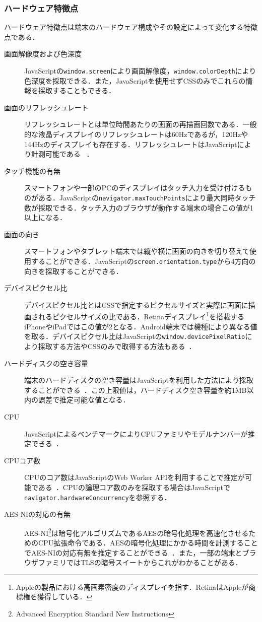 \subsubsection{ハードウェア特徴点}
ハードウェア特徴点は端末のハードウェア構成やその設定によって変化する特徴点である．
\begin{description}
\item[画面解像度および色深度]JavaScriptの\texttt{window.screen}により画面解像度，\texttt{window.colorDepth}により色深度を採取できる．また，JavaScriptを使用せずCSSのみでこれらの情報を採取することもできる．
\item[画面のリフレッシュレート]リフレッシュレートとは単位時間あたりの画面の再描画回数である．一般的な液晶ディスプレイのリフレッシュレートは60Hzであるが，120Hzや144Hzのディスプレイも存在する．リフレッシュレートはJavaScriptにより計測可能である~\cite{takasu2015survey} ．
\item[タッチ機能の有無]スマートフォンや一部のPCのディスプレイはタッチ入力を受け付けるものがある．JavaScriptの\texttt{navigator.maxTouchPoints}により最大同時タッチ数が採取できる．タッチ入力のブラウザが動作する端末の場合この値が1以上になる．
\item[画面の向き]スマートフォンやタブレット端末では縦や横に画面の向きを切り替えて使用することができる．JavaScriptの\texttt{screen.orientation.type}から4方向の向きを採取することができる．
\item[デバイスピクセル比]デバイスピクセル比とはCSSで指定するピクセルサイズと実際に画面に描画されるピクセルサイズの比である．Retinaディスプレイ\footnote{Appleの製品における高画素密度のディスプレイを指す．RetinaはAppleが商標権を獲得している．}を搭載するiPhoneやiPadではこの値が2となる．Android端末では機種により異なる値を取る．デバイスピクセル比はJavaScriptの\texttt{window.devicePixelRatio}により採取する方法やCSSのみで取得する方法もある~\cite{takei2015web}．
\item[ハードディスクの空き容量]端末のハードディスクの空き容量はJavaScriptを利用した方法により採取することができる~\cite{takasu2015survey}．この上限値は，ハードディスク空き容量を約1MB以内の誤差で推定可能な値となる．
\item[CPU]JavaScriptによるベンチマークによりCPUファミリやモデルナンバーが推定できる~\cite{saito2017web}．
\item[CPUコア数]CPUのコア数はJavaScriptのWeb Worker APIを利用することで推定が可能である~\cite{桐生直輝2014web}．CPUの論理コア数のみを採取する場合はJavaScriptで\texttt{navigator.hardwareConcurrency}を参照する．
\item[AES-NIの対応の有無]AES-NI\footnote{Advanced Encryption Standard New Instructions}は暗号化アルゴリズムであるAESの暗号化処理を高速化させるためのCPU拡張命令である．AESの暗号化処理にかかる時間を計測することでAES-NIの対応有無を推定することができる~\cite{saito2016estimating}．また，一部の端末とブラウザファミリではTLSの暗号スイートからこれがわかることがある．

\end{description}
